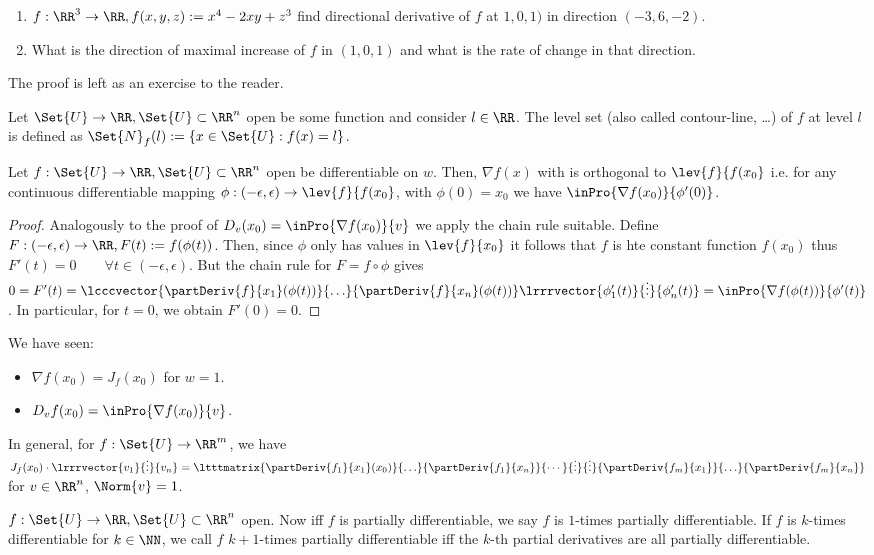 \begin{exam}
  \begin{enumerate}
  	\item $f:\RR^3\to\RR, f(x,y,z):=x^4-2xy+z^3$ find directional derivative of $f$ at $1,0,1)$ in direction $(-3,6,-2)$. 
  	\item What is the direction of maximal increase of $f$ in $(1,0,1)$ and what is the rate of change in that direction. 
  \end{enumerate}
  The proof is left as an exercise to the reader. 
\end{exam}
\begin{defn}
  Let $\Set{U}\to\RR, \Set{U}\subset\RR^n$ open be some function and consider $l\in\RR$. The level set (also called contour-line, \ldots) of $f$ at level $l$ is defined as $\Set{N}_f(l):=\{x\in\Set{U}:f(x)=l\}$. 
\end{defn}
\begin{prop}
  Let $f:\Set{U}\to\RR, \Set{U}\subset\RR^n$ open be differentiable on $w$. Then, $\nabla f(x)$ with  is orthogonal to $\lev{f}{f(x_0}$ i.e. for any continuous differentiable mapping $\phi:(-\epsilon,\epsilon)\to\lev{f}{f(x_0}$, with $\phi(0)=x_0$ we have $\inPro{\nabla f(x_0)}{\phi'(0)}$.
\end{prop}
\begin{proof}
  Analogously to the proof of $D_v(x_0)=\inPro{\nabla f(x_0)}{v}$ we apply the chain rule suitable. Define $F:(-\epsilon, \epsilon)\to\RR, F(t):=f(\phi(t))$. Then, since $\phi$ only has values in $\lev{f}{x_0}$ it follows that $f$ is hte constant function $f(x_0)$ thus $F'(t)=0\qquad\forall t\in(-\epsilon,\epsilon)$. But the chain rule for $F=f\circ \phi$ gives $0=F'(t)=\lcccvector{\partDeriv{f}{x_1}(\phi(t))}{\ldots}{\partDeriv{f}{x_n}(\phi(t))}\lrrrvector{\phi_1'(t)}{\vdots}{\phi_n'(t)}=\inPro{\nabla f(\phi(t))}{\phi'(t)}$. In particular, for $t=0$, we obtain $F'(0)=0$. 
\end{proof}
\begin{rem}
  We have seen: \begin{itemize}
  	\item $\nabla f(x_0)=J_f(x_0)$ for $w=1$. 
  	\item $D_vf(x_0)=\inPro{\nabla f(x_0)}{v}$.
  \end{itemize}
  In general, for $f:\Set{U}\to\RR^m$, we have $J_f(x_0)\cdot \lrrrvector{v_1}{\vdots}{v_n}=\ltttmatrix{\partDeriv{f_1}{x_1}(x_0)}{\ldots}{\partDeriv{f_1}{x_n}}{\cdots}{\vdots}{\vdots}{\partDeriv{f_m}{x_1}}{\ldots}{\partDeriv{f_m}{x_n}}$ for $v\in\RR^n$, $\Norm{v}=1$. 
\end{rem}
\begin{defn}
  $f:\Set{U}\to\RR, \Set{U}\subset\RR^n$ open. 
  Now iff $f$ is partially differentiable, we say $f$ is $1$-times partially differentiable. If $f$ is $k$-times differentiable for $k\in\NN$, we call $f$ $k+1$-times partially differentiable iff the $k$-th partial derivatives are all partially differentiable. 
\end{defn}

